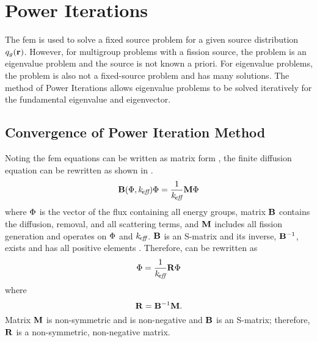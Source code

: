 \section{Power Iterations}
  \label{sec:power_iterations}
  The \gls{fem} is used to solve a fixed source problem for a given source
  distribution $q_g(\mathbf{r})$. However, for multigroup problems with a fission 
  source, the problem is an eigenvalue problem and the source is not known a 
  priori.  For eigenvalue problems, the problem is also not a fixed-source 
  problem and has many solutions. The method of Power Iterations allows 
  eigenvalue problems to be solved iteratively for the fundamental eigenvalue 
  and eigenvector.

  \subsection{Convergence of Power Iteration Method}
    Noting the \gls{fem} equations can be written as matrix form
    , the finite diffusion equation can be rewritten as
    shown in \cite{gehinThesis}.
    \begin{equation}
      \label{eq:gehin_notation}
      \mathbf{B}(\Phi,k_{\!\mbox{\scriptsize \em eff}}) \Phi = \frac{1}{k_{\!\mbox{\scriptsize \em eff}}} \mathbf{M} \Phi
    \end{equation}
    where $\Phi$ is the vector of the flux containing all energy groups, matrix 
    $\mathbf{B}$ contains the diffusion, removal, and all scattering terms, and $\mathbf{M}$ 
    includes all fission generation and operates on $\Phi$ and $k_{\!\mbox{\scriptsize \em eff}}$. $\mathbf{B}$
    is an S-matrix and its inverse, $\mathbf{B}^{-1}$, exists and has all positive 
    elements \cite{nakamura}. Therefore,  can be 
    rewritten as
    \begin{equation}
      \label{eq:gehin_solution}
      \Phi = \frac{1}{k_{\!\mbox{\scriptsize \em eff}}} \mathbf{R} \Phi
    \end{equation}
    where
    \begin{equation}
      \label{eq:gehin_r}
      \mathbf{R} = \mathbf{B}^{-1} \mathbf{M}.
    \end{equation}
    Matrix $\mathbf{M}$ is non-symmetric and is non-negative and $\mathbf{B}$ is an S-matrix;
    therefore, $\mathbf{R}$ is a non-symmetric, non-negative matrix.

